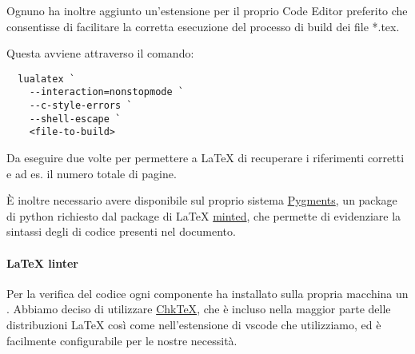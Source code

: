 \documentclass[../../norme-di-progetto.tex]{subfiles}
\begin{document}
Ognuno ha inoltre aggiunto un'estensione per il proprio Code Editor preferito che consentisse di facilitare la corretta esecuzione del processo di build dei file *.tex.

Questa avviene attraverso il comando:

\begin{verbatim}
  lualatex `
    --interaction=nonstopmode `
    --c-style-errors `
    --shell-escape `
    <file-to-build>
\end{verbatim}

Da eseguire due volte per permettere a \LaTeX{} di recuperare i riferimenti corretti e ad es\@. il numero totale di pagine.

È inoltre necessario avere disponibile sul proprio sistema \href{https://pygments.org/}{Pygments}, un package di python richiesto dal package di \LaTeX{} \href{https://ctan.org/pkg/minted?lang=en}{minted}, che permette di evidenziare la sintassi degli  di codice presenti nel documento.

\paragraph{\LaTeX{} linter}%
\label{par:latex_linter}

Per la verifica del codice ogni componente ha installato sulla propria macchina un .
Abbiamo deciso di utilizzare \href{https://www.nongnu.org/chktex/}{Chk\TeX}, che è incluso nella maggior parte delle distribuzioni \LaTeX{} così come nell'estensione di vscode che utilizziamo, ed è facilmente configurabile per le nostre necessità.
\end{document}

